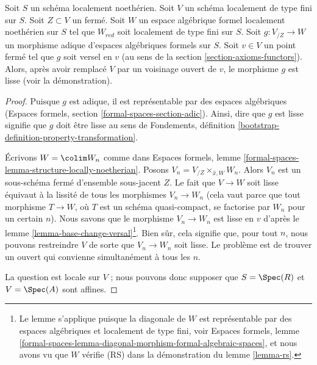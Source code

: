 \begin{lemma}
\label{lemma-openness-smoothness}
Soit $S$ un schéma localement noethérien. Soit $V$ un schéma localement
de type fini sur $S$. Soit $Z \subset V$ un fermé. Soit $W$ un
espace algébrique formel localement noethérien sur $S$ tel que
$W_{red}$ soit localement de type fini sur $S$. Soit $g : V_{/Z} \to W$
un morphisme adique d'espaces algébriques formels sur $S$. Soit $v \in V$
un point fermé tel que $g$ soit versel en $v$ (au sens de la
section \ref{section-axioms-functors}).
Alors, après avoir remplacé $V$ par un voisinage ouvert de $v$, le
morphisme $g$ est lisse (voir la démonstration).
\end{lemma}

\begin{proof}
Puisque $g$ est adique, il est représentable par des espaces algébriques (Espaces formels,
section \ref{formal-spaces-section-adic}).
Ainsi, dire que $g$ est lisse signifie que $g$ doit être lisse
au sens de
Fondements, définition \ref{bootstrap-definition-property-transformation}.

\medskip\noindent
Écrivons $W = \colim W_n$ comme dans Espaces formels, lemme
\ref{formal-spaces-lemma-structure-locally-noetherian}.
Posons $V_n = V_{/Z} \times_{\hat x, W} W_n$.
Alors $V_n$ est un sous-schéma fermé d'ensemble sous-jacent $Z$.
Le fait que $V \to W$ soit lisse équivaut à la lissité
de tous les morphismes $V_n \to W_n$ (cela vaut parce que tout morphisme
$T \to W$, où $T$ est un schéma quasi-compact, se factorise par
$W_n$ pour un certain $n$). Nous savons que le morphisme $V_n \to W_n$
est lisse en $v$ d'après le
lemme \ref{lemma-base-change-versal}\footnote{Le lemme s'applique puisque
la diagonale de $W$ est représentable par des espaces algébriques et
localement de type fini, voir Espaces formels, lemme
\ref{formal-spaces-lemma-diagonal-morphism-formal-algebraic-spaces},
et nous avons vu que $W$ vérifie (RS) dans la démonstration du lemme \ref{lemma-rs}.}.
Bien sûr, cela signifie que, pour tout $n$, nous pouvons restreindre $V$
de sorte que $V_n \to W_n$ soit lisse. Le problème est de trouver
un ouvert qui convienne simultanément à tous les $n$.

\medskip\noindent
La question est locale sur $V$ ; nous pouvons donc supposer que $S = \Spec(R)$ et
$V = \Spec(A)$ sont affines.


\end{proof}
